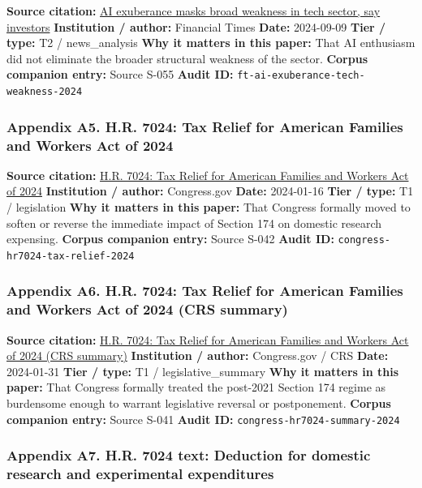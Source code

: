 \documentclass[
  american,
  11pt,
  letterpaper,
]{article}
\begin{document}
\textbf{Source citation:}
\href{https://www.ft.com/content/0b14d871-2d19-46f1-9660-5466301e8066}{AI
exuberance masks broad weakness in tech sector, say investors}
\textbf{Institution / author:} Financial Times \textbf{Date:} 2024-09-09
\textbf{Tier / type:} T2 / news\_analysis \textbf{Why it matters in this
paper:} That AI enthusiasm did not eliminate the broader structural
weakness of the sector. \textbf{Corpus companion entry:} Source S-055
\textbf{Audit ID:} \texttt{ft-ai-exuberance-tech-weakness-2024}

\subsubsection{Appendix A5. H.R. 7024: Tax Relief for American Families
and Workers Act of
2024}\label{ch-05-appendix-a5-h-r-7024-tax-relief-for-american-families-and-workers-act-of-2024}

\textbf{Source citation:}
\href{https://www.congress.gov/bill/118th-congress/house-bill/7024}{H.R.
7024: Tax Relief for American Families and Workers Act of 2024}
\textbf{Institution / author:} Congress.gov \textbf{Date:} 2024-01-16
\textbf{Tier / type:} T1 / legislation \textbf{Why it matters in this
paper:} That Congress formally moved to soften or reverse the immediate
impact of Section 174 on domestic research expensing. \textbf{Corpus
companion entry:} Source S-042 \textbf{Audit ID:}
\texttt{congress-hr7024-tax-relief-2024}

\subsubsection{Appendix A6. H.R. 7024: Tax Relief for American Families
and Workers Act of 2024 (CRS
summary)}\label{ch-05-appendix-a6-h-r-7024-tax-relief-for-american-families-and-workers-act-of-2024-crs-summary}

\textbf{Source citation:}
\href{https://www.congress.gov/bill/118th-congress/house-bill/7024}{H.R.
7024: Tax Relief for American Families and Workers Act of 2024 (CRS
summary)} \textbf{Institution / author:} Congress.gov / CRS
\textbf{Date:} 2024-01-31 \textbf{Tier / type:} T1 /
legislative\_summary \textbf{Why it matters in this paper:} That
Congress formally treated the post-2021 Section 174 regime as burdensome
enough to warrant legislative reversal or postponement. \textbf{Corpus
companion entry:} Source S-041 \textbf{Audit ID:}
\texttt{congress-hr7024-summary-2024}

\subsubsection{Appendix A7. H.R. 7024 text: Deduction for domestic
research and experimental
expenditures}\label{ch-05-appendix-a7-h-r-7024-text-deduction-for-domestic-research-and-experimental-expenditures}
\end{document}
